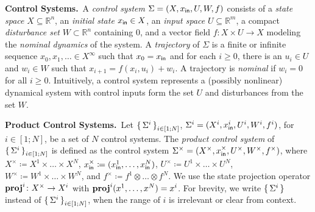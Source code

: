 

 
\smallskip
\noindent\textbf{Control Systems.}\
A \emph{control system} $\Sigma = (X, x_{\mathsf{in}}, U, W, f)$
consists of a \emph{state space} $X\subseteq \mathbb{R}^n$,
an \emph{initial state} $x_{\mathsf{in}}\in X$,
an \emph{input space} $U\subseteq\mathbb{R}^m$, 
a compact \emph{disturbance set} $W\subset \mathbb{R}^n$ containing $0$, and a vector field $f:X\times U\rightarrow X$ modeling the \emph{nominal dynamics} of the system. 
A \emph{trajectory} of $\Sigma$ is a finite or infinite sequence $x_0, x_1, \ldots \in X^\infty$
such that $x_0 = x_{\mathsf{in}}$ and for each $i\geq 0$, there is an $u_i\in U$ and $w_i \in W$ such that
$x_{i+1} = f(x_i, u_i) + w_i$.
A trajectory is \emph{nominal} if $w_i = 0$ for all $i\geq 0$.
Intuitively, a control system represents a (possibly nonlinear) dynamical system with control inputs form the set $U$
and disturbances from the set $W$.

\smallskip
\noindent\textbf{Product Control Systems.}\
Let $\set{\Sigma^i}_{i\in [1;N]}$, 
$\Sigma^i=(X^i,x_{\mathsf{in}}^i,U^i,W^i,f^i)$, for $i \in [1;N]$, be a set of $N$ control systems. 
The \emph{product control system} of $\set{\Sigma^i}_{i\in [1;N]}$ is defined as the control system 
$\Sigma^\times = (X^\times, x_{\mathsf{in}}^\times, U^\times, W^\times, f^\times)$,
where $X^\times \coloneqq X^1 \times \ldots \times X^N$, 
$x_{\mathsf{in}}^\times \coloneqq (x_{\mathsf{in}}^1, \ldots, x_{\mathsf{in}}^N)$,
$U^\times \coloneqq U^1 \times \ldots \times U^N$, 
$W^\times \coloneqq W^1 \times \ldots \times W^N$, 
and $f^\times\coloneqq f^1\otimes \ldots \otimes f^N$.
We use the state projection operator $\mathbf{proj}^{i}\colon X^\times\to X^i$ with $\mathbf{proj}^{i} (x^1,\ldots,x^N) = x^i$. 
For brevity, we write $\set{\Sigma^i}$ instead of $\set{\Sigma^i}_{i\in [1;N]}$, when the range of $i$ is irrelevant or clear from context.

